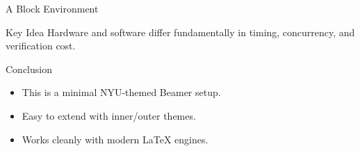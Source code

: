 \documentclass{beamer}
\begin{document}
\begin{frame}{A Block Environment}
  \begin{block}{Key Idea}
    Hardware and software differ fundamentally in timing, concurrency, and verification cost.
  \end{block}
\end{frame}

\begin{frame}{Conclusion}
  \begin{itemize}
    \item This is a minimal NYU-themed Beamer setup.
    \item Easy to extend with inner/outer themes.
    \item Works cleanly with modern LaTeX engines.
  \end{itemize}
\end{frame}
\end{document}
